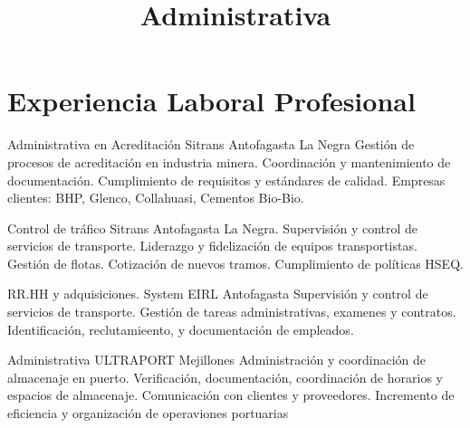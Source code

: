 \documentclass[draft,color,12pt,letterpaper,sans]{moderncv}
\title{Administrativa}
\begin{document}
\makecvtitle %

\section{Experiencia Laboral Profesional}

{Administrativa en Acreditación }
{\newline Sitrans}
{\newline Antofagasta}
{La Negra}
{Gestión de procesos de acreditación en industria minera. 
\newline Coordinación y mantenimiento de documentación.
\newline Cumplimiento de requisitos y estándares de calidad.
\newline Empresas clientes: BHP, Glenco, Collahuasi, Cementos Bio-Bio.
\newline}

{Control de tráfico}
{\newline Sitrans}
{\newline Antofagasta}
{La Negra.}
{Supervisión y control de servicios de transporte.
\newline Liderazgo y fidelización de equipos transportistas. 
\newline Gestión de  flotas. Cotización de  nuevos tramos.
\newline Cumplimiento de políticas HSEQ.
\newline}

{RR.HH y adquisiciones. }
{\newline System EIRL}
{\newline Antofagasta}
{}
{Supervisión y control de servicios de transporte.
\newline Gestión de tareas administrativas, examenes y contratos.
\newline Identificación, reclutamieento, y documentación  de empleados.
\newline}

{Administrativa}
{\newline ULTRAPORT}
{\newline Mejillones}
{}
{Administración y coordinación de almacenaje en puerto.
\newline Verificación, documentación, coordinación de horarios y espacios de almacenaje.
\newline Comunicación con clientes y proveedores.
\newline Incremento de eficiencia y organización de operaviones portuarias
\newline}
\end{document}
